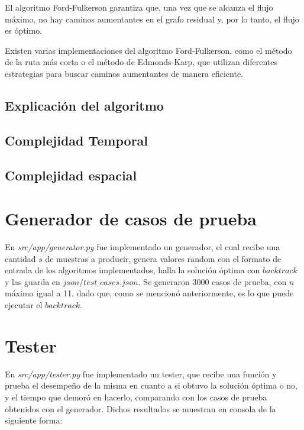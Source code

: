 \documentclass[10pt]{article} %
\begin{document}
	El algoritmo Ford-Fulkerson garantiza que, una vez que se alcanza el flujo máximo, no hay caminos aumentantes en el grafo residual y, por lo tanto, el flujo es óptimo.
	
	Existen varias implementaciones del algoritmo Ford-Fulkerson, como el método de la ruta más corta o el método de Edmonds-Karp, que utilizan diferentes estrategias para buscar caminos aumentantes de manera eficiente.
	
	\subsection{Explicaci\'on del algoritmo}
	
	\subsection{Complejidad Temporal}
	
	\subsection{Complejidad espacial}
		
	\section{Generador de casos de prueba}
	
	En \textit{src/app/generator.py} fue implementado un generador, el cual recibe una cantidad $ s $ de muestras a producir, genera valores random con el formato de entrada de los algoritmos implementados, halla la soluci\'on \'optima con $ backtrack $ y las guarda en $ json/test\_cases.json $. Se generaron 3000 casos de prueba, con $ n $ m\'aximo igual a 11, dado que, como se mencion\'o anteriormente, es lo que puede ejecutar el $ backtrack $.
	
	\section{Tester}
	En \textit{src/app/tester.py} fue implementado un tester, que recibe una funci\'on y prueba el desempe\~no de la misma en cuanto a si obtuvo la soluci\'on \'optima o no, y el tiempo que demor\'o en hacerlo, comparando con los casos de prueba obtenidos con el generador. Dichos resultados se muestran en consola de la siguiente forma:
%	 		
	 
\end{document}
